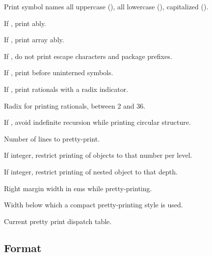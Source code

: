 \begin{LIST}{1cm}
  {
  Print symbol names all uppercase (), all lowercase
  (), capitalized ().
  }

  {
  If \T, print ably.
  }

  {
  If \T, print array ably.
  }

  {
  If \NIL, do not print escape characters and package prefixes.
  }

  {
  If \T, print \kwd{:\#} before uninterned symbols.
  }

  {
  If \T, print rationals with a radix indicator.
  }

  {
  Radix for printing rationals, between 2 and 36.
  }

  {
  If \T, avoid indefinite recursion while printing circular
  structure. 
  }

  {
  Number of lines to pretty-print.
  }

  {
  If integer, restrict printing of objects to that number per level.
  }

  {
  If integer, restrict printing of nested object to that depth.
  }

  {
  Right margin width in ems while pretty-printing.
  }

  {
  Width below which a compact pretty-printing style is used.
  }

  {
  Current pretty print dispatch table.
  }

\end{LIST}



\subsection{Format}
\label{section:Format}

